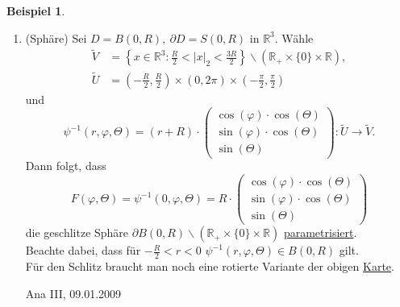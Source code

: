 \documentclass[a4paper]{report}
\newcommand{\R}{\mathbb{R}}
\newcommand{\jlabel}[1]{\label{j_#1}}
\newcommand{\jhyperref}[2]{\hyperref[j_#1]{#2}}
\newcommand{\jlink}[1]{\jhyperref{#1}{#1}}
\newcommand{\jspacesmall}{\vspace{4pt}}
\newcommand{\jdate}[1]{\jspacesmall\begin{center}\jlabel{#1}\tiny{Ana III, #1}\end{center}}
\theoremstyle{plain}
\theoremstyle{definition}
\newtheorem{expl}[thm]{Beispiel}
\begin{document}
{{{{\jlabel{Bsp 4.3}
\begin{expl}
    \begin{enumerate}
        \item (Sphäre) Sei $D=B(0,R),\ \partial D=S(0,R)$ in $\R^3$. Wähle 
        \[
            \begin{split}
                \tilde{V} &= \left\{x \in \R^3 : \frac{R}{2} < |x|_2 < \frac{3R}{2} \right\} \backslash (\R_+ \times \{0\} \times \R),\\
                \tilde{U} &= \left(-\frac{R}{2}, \frac{R}{2} \right) \times (0,2\pi) \times \left(-\frac{\pi}{2}, \frac{\pi}{2} \right)
            \end{split}
        \]
        und
        \[
            \psi^{-1}(r,\varphi, \Theta) = (r+R)\cdot \begin{pmatrix}
                                                          \cos(\varphi)\cdot \cos(\Theta)\\
                                                          \sin(\varphi)\cdot \cos(\Theta)\\
                                                          \sin(\Theta)
                                                      \end{pmatrix} : \tilde{U} \rightarrow \tilde{V}.
        \]
        Dann folgt, dass
        \[
            F(\varphi, \Theta) = \psi^{-1}(0, \varphi, \Theta) = R\cdot \begin{pmatrix}
                                                                            \cos(\varphi)\cdot \cos(\Theta)\\
                                                                            \sin(\varphi)\cdot \cos(\Theta)\\
                                                                            \sin(\Theta)
                                                                        \end{pmatrix}
        \]
        die geschlitze Sphäre $\partial B(0,R)\backslash (\R_+ \times \{0\} \times \R)$ \jhyperref{Parametrisierung}{parametrisiert}.\\
        Beachte dabei, dass für $-\frac{R}{2} < r < 0$ $\psi^{-1}(r,\varphi, \Theta) \in B(0,R)$ gilt.\\
        Für den Schlitz braucht man noch eine rotierte Variante der obigen \jlink{Karte}.
        
        
\jdate{09.01.2009}
        

\end{enumerate}
\end{expl}}}}}
\end{document}
